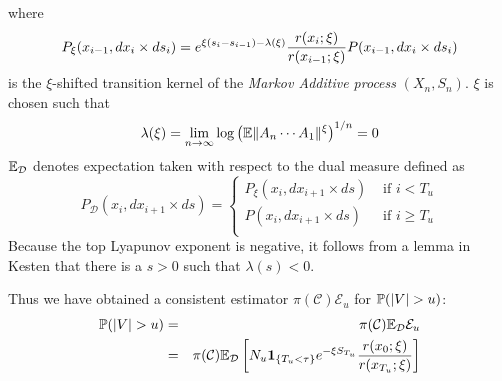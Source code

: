 \documentclass{article}
\theoremstyle{remark}
\begin{document}
where
\[
P_\xi(x_{i-1}, dx_i \times ds_i) = e^{\xi(s_i - s_{i-1}) -
  \lambda(\xi)} {r(x_i; \xi) \over r(x_{i-1}; \xi)} P(x_{i-1}, dx_i
\times ds_i)
\]
is the $\xi$-shifted transition kernel of the {\it Markov Additive
  process} $(X_n, S_n)$. $\xi$ is chosen such that 
\[
\lambda(\xi) = \lim_{n \to \infty} \log \left(
\E \|A_n \cdots A_1\|^\xi
\right)^{1/n} = 0
\]
$\E_{\mathcal D}$ denotes expectation taken with respect to the dual
measure defined as
\[
P_{\mathcal D} (x_i, dx_{i+1} \times ds) = \left\{
  \begin{array}{ll}
    P_\xi (x_i, dx_{i+1} \times ds) & \text{ if } i < T_u \\
    P(x_i, dx_{i+1} \times ds) & \text{ if } i \geq T_u \\
  \end{array}
\right.
\]
Because the top Lyapunov exponent is negative, it follows from a lemma
in Kesten \cite{Kesten1973} that there is a $s > 0$ such that
$\lambda(s) < 0$.

Thus we have obtained a consistent estimator
$\pi(\mathcal C)\mathcal E_u$ for $\P(|V| > u)$:
\begin{eqnarray*}
\P(|V| > u) &=& \pi(\mathcal C) \E_{\mathcal D} \mathcal E_u \\
&=& \pi(\mathcal C) \E_{\mathcal D} \left[
  N_u \1{T_u < \tau} e^{-\xi S_{T_u}} {r(x_0; \xi)
    \over r(x_{T_u}; \xi)}
\right]
\end{eqnarray*}
\end{document}
